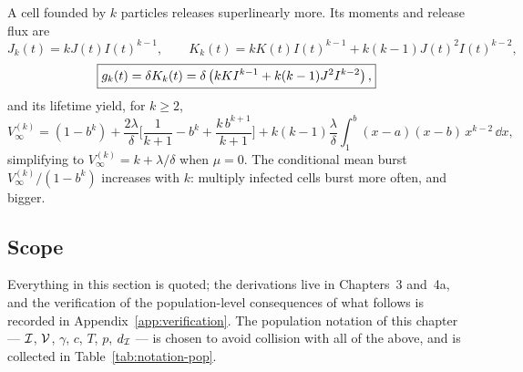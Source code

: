 A cell founded by $k$ particles releases superlinearly more. Its moments
and release flux are
\begin{equation}
J_k(t)=kJ(t)I(t)^{k-1},\qquad
K_k(t)=kK(t)I(t)^{k-1}+k(k-1)J(t)^2I(t)^{k-2},
\end{equation}
\begin{equation}
\boxed{g_k(t)=\delta K_k(t)
=\delta\left( kK I^{k-1}+k(k-1)J^2I^{k-2}\right),}
\label{eq:gk}
\end{equation}
and its lifetime yield, for $k\ge2$,
\begin{equation}
\boxed{V_\infty^{(k)}
=(1-b^k)
+\frac{2\lambda}{\delta}\Biggl[\frac{1}{k+1}-b^k+\frac{k\,b^{k+1}}{k+1}\Biggr]
+k(k-1)\frac{\lambda}{\delta}\int_1^b (x-a)(x-b)\,x^{k-2}\,\dd x,}
\label{eq:Vk}
\end{equation}
simplifying to $V_\infty^{(k)}=k+\lambda/\delta$ when $\mu=0$. The
conditional mean burst $V_\infty^{(k)}/(1-b^k)$ increases with $k$:
multiply infected cells burst more often, and bigger.

\subsection*{Scope}

Everything in this section is quoted; the derivations live in Chapters~3
and~4a, and the verification of the population-level consequences of what
follows is recorded in Appendix~\ref{app:verification}. The population
notation of this chapter --- $\mathcal{I}$, $\mathcal{V}$, $\gamma$, $c$, $T$,
$p$, $d_{\mathcal{I}}$ --- is chosen to avoid collision with all of the above,
and is collected in Table~\ref{tab:notation-pop}.

